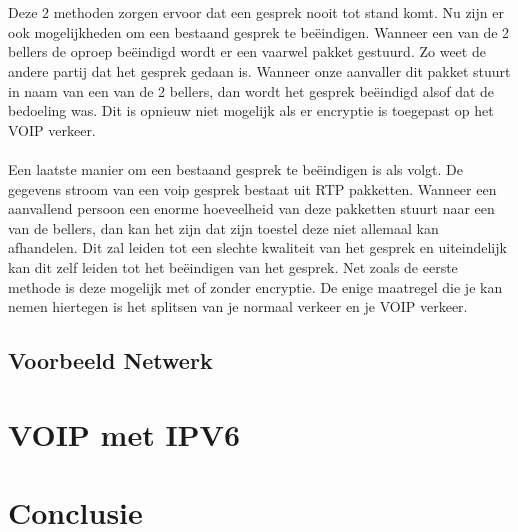 \documentclass[pdftex,a4paper,12pt,twoside]{report}
\begin{document}
\\ \\
Deze 2 methoden zorgen ervoor dat een gesprek nooit tot stand komt. Nu zijn er ook mogelijkheden om een bestaand gesprek te beëindigen. Wanneer een van de 2 bellers de oproep beëindigd wordt er een vaarwel pakket gestuurd. Zo weet de andere partij dat het gesprek gedaan is. Wanneer onze aanvaller dit pakket stuurt in naam van een van de 2 bellers, dan wordt het gesprek beëindigd alsof dat de bedoeling was. Dit is opnieuw niet mogelijk als er encryptie is toegepast op het VOIP verkeer.
\\ \\
Een laatste manier om een bestaand gesprek te beëindigen is als volgt. De gegevens stroom van een voip gesprek bestaat uit RTP pakketten. Wanneer een aanvallend persoon een enorme hoeveelheid van deze pakketten stuurt naar een van de bellers, dan kan het zijn dat zijn toestel deze niet allemaal kan afhandelen. Dit zal leiden tot een slechte kwaliteit van het gesprek en uiteindelijk kan dit zelf leiden tot het beëindigen van het gesprek. Net zoals de eerste methode is deze mogelijk met of zonder encryptie. De enige maatregel die je kan nemen hiertegen is het splitsen van je normaal verkeer en je VOIP verkeer. 


\section{Voorbeeld Netwerk}

\chapter{VOIP met IPV6}
\label{ch:VOIP met IPV6}




\chapter{Conclusie}
\label{ch:conclusie}








\listoffigures
\listoftables
\end{document}
